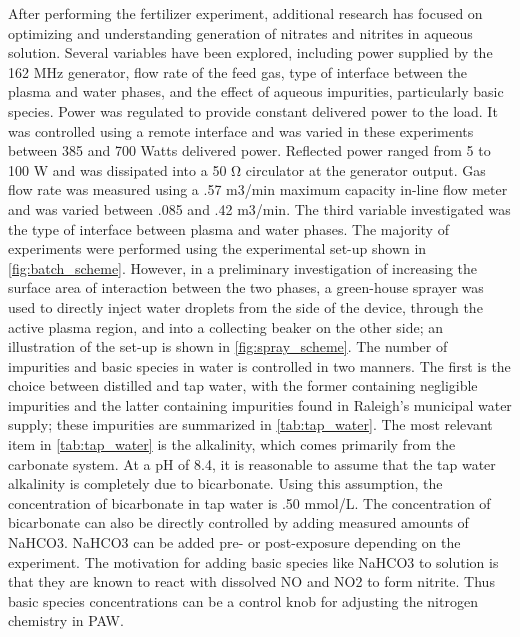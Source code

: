 After performing the fertilizer experiment, additional research has focused on optimizing and understanding generation of nitrates and nitrites in aqueous solution.  Several variables have been explored, including power supplied by the 162 MHz generator, flow rate of the feed gas, type of interface between the plasma and water phases, and the effect of aqueous impurities, particularly basic species.  Power was regulated to provide constant delivered power to the load.  It was controlled using a remote interface and was varied in these experiments between 385 and 700 Watts delivered power.  Reflected power ranged from 5 to 100 W and was dissipated into a 50 Ω circulator at the generator output.  Gas flow rate was measured using a .57 m3/min maximum capacity in-line flow meter and was varied between .085 and .42 m3/min.  The third variable investigated was the type of interface between plasma and water phases.  The majority of experiments were performed using the experimental set-up shown in \cref{fig:batch_scheme}.  However, in a preliminary investigation of increasing the surface area of interaction between the two phases, a green-house sprayer was used to directly inject water droplets from the side of the device, through the active plasma region, and into a collecting beaker on the other side; an illustration of the set-up is shown in \cref{fig:spray_scheme}.  The number of impurities and basic species in water is controlled in two manners.  The first is the choice between distilled and tap water, with the former containing negligible impurities and the latter containing impurities found in Raleigh's municipal water supply; these impurities are summarized in \cref{tab:tap_water}.  The most relevant item in \cref{tab:tap_water} is the alkalinity, which comes primarily from the carbonate system.  At a pH of 8.4, it is reasonable to assume that the tap water alkalinity is completely due to bicarbonate. \cite{benjamin2014water} Using this assumption, the concentration of bicarbonate in tap water is .50 mmol/L.  The concentration of bicarbonate can also be directly controlled by adding measured amounts of NaHCO3.   NaHCO3 can be added pre- or post-exposure depending on the experiment.  The motivation for adding basic species like NaHCO3 to solution is that they are known to react with dissolved NO and NO2 to form nitrite. \cite{greenwood1984chemistry} Thus basic species concentrations can be a control knob for adjusting the nitrogen chemistry in PAW.

